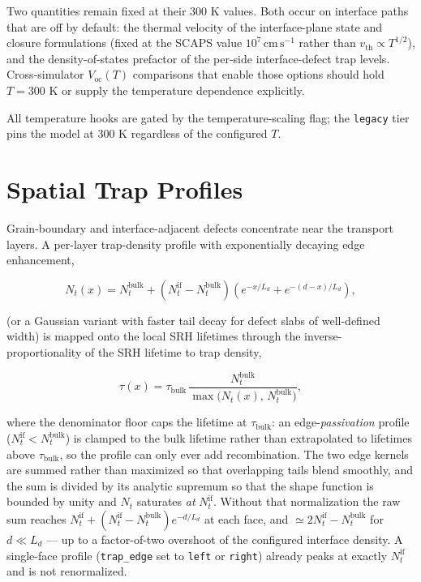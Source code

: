 \documentclass[
  11pt,
  american,
]{report}
\begin{document}
Two quantities remain fixed at their 300 K values. Both occur on
interface paths that are off by default: the thermal velocity of the
interface-plane state and closure formulations (fixed at the SCAPS value
\(10^{7}\,\mathrm{cm\,s^{-1}}\) rather than
\(v_\mathrm{th}\propto T^{1/2}\)), and the density-of-states prefactor
of the per-side interface-defect trap levels. Cross-simulator
\(V_\mathrm{oc}(T)\) comparisons that enable those options should hold
\(T=300\) K or supply the temperature dependence explicitly.

All temperature hooks are gated by the temperature-scaling flag; the
\texttt{legacy} tier pins the model at 300 K regardless of the
configured \(T\).

\hypertarget{spatial-trap-profiles}{%
\section{Spatial Trap Profiles}\label{spatial-trap-profiles}}

Grain-boundary and interface-adjacent defects concentrate near the
transport layers. A per-layer trap-density profile with exponentially
decaying edge enhancement,

\begin{equation}
\label{eq:trap-profile}
N_t(x)
=
N_t^\mathrm{bulk}
+\left(N_t^\mathrm{if}-N_t^\mathrm{bulk}\right)
\left(e^{-x/L_d}+e^{-(d-x)/L_d}\right),
\end{equation}

(or a Gaussian variant with faster tail decay for defect slabs of
well-defined width) is mapped onto the local SRH lifetimes through the
inverse-proportionality of the SRH lifetime to trap density,

\[
\tau(x)
=
\tau_\mathrm{bulk}\,
\frac{N_t^\mathrm{bulk}}{\max\!\big(N_t(x),\,N_t^\mathrm{bulk}\big)} ,
\]

where the denominator floor caps the lifetime at \(\tau_\mathrm{bulk}\):
an edge-\emph{passivation} profile
(\(N_t^\mathrm{if} < N_t^\mathrm{bulk}\)) is clamped to the bulk
lifetime rather than extrapolated to lifetimes above
\(\tau_\mathrm{bulk}\), so the profile can only ever add recombination.
The two edge kernels are summed rather than maximized so that
overlapping tails blend smoothly, and the sum is divided by its analytic
supremum so that the shape function is bounded by unity and \(N_t\)
saturates \emph{at} \(N_t^\mathrm{if}\). Without that normalization the
raw sum reaches
\(N_t^\mathrm{if} + (N_t^\mathrm{if}-N_t^\mathrm{bulk}) e^{-d/L_d}\) at
each face, and \(\simeq 2N_t^\mathrm{if}-N_t^\mathrm{bulk}\) for
\(d \ll L_d\) --- up to a factor-of-two overshoot of the configured
interface density. A single-face profile (\texttt{trap\_edge} set to
\texttt{left} or \texttt{right}) already peaks at exactly
\(N_t^\mathrm{if}\) and is not renormalized.
\end{document}
